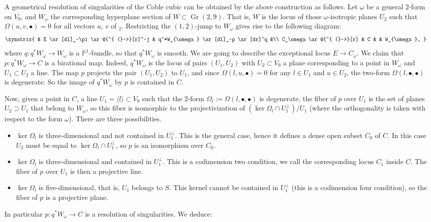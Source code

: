 \documentclass[JEP,XML,SOM,Unicode,NoEqCountersInSection]{cedram}
\newcommand{\sbullet}{{\scriptstyle\bullet}}
\theoremstyle{plain}
\theoremstyle{definition}
\DeclareMathOperator{\Gr}{Gr}
\newcommand{\PP}{\mathbb{P}}
\begin{document}
A geometrical resolution of singularities of the Coble cubic can be obtained by the above construction
as follows. Let $\omega$ be a general 2-form on $V_9$, and $W_\omega$ the corresponding hyperplane section of
$W \subset \Gr(2,9)$. That is, $W$ is the locus of those $\omega$-isotropic planes $U_2$ such that
$\Omega(u,v,\sbullet)=0$ for all vectors $u$, $v$ of $_2$. Restricting the $(1,2)$-jump
to $W_\omega$ gives rise to the following diagram:
\begin{equation*}\label{eq:the-reso-of-coble}
\xymatrix{
& E \ar[dl]_-\pi \ar@{^{ (}->}[r]^-j & q^*W_{\omega} \ar[dl]_-p \ar[dr]^q &\\
C_\omega \ar@{^{ (}->}[r] & C & & W_{\omega},
}
\end{equation*}
where $q: q^*W_{\omega} \to W_{\omega}$ is a $\PP^1$-bundle, so that $q^*W_{\omega}$ is smooth. We are going
to describe the exceptional locus $E \to C_\omega$.
We claim that $p: q^* W_{\omega} \to C$ is a birational map. Indeed, $q^*W_{\omega}$ is the locus
of pairs $(U_1,U_2)$ with $U_2 \subset V_9$ a plane corresponding to a point in $W_{\omega}$ and
$U_1 \subset U_2$ a line. The map $p$ projects the
pair $(U_1,U_2)$ to $U_1$, and since $\Omega(l,u,\sbullet)=0$ for any $l\in U_1$ and $u\in U_2$, the two-form
$\Omega(l,\sbullet,\sbullet)$ is degenerate. So the image of $q^*W_{\omega}$ by $p$ is contained in $C$.

Now, given a point in $C$, \ie a line $U_1=\langle l\rangle\subset V_9$ such that the 2-form $\Omega_l:=\Omega(l,\sbullet,\sbullet)$
is degenerate, the fiber of $p$ over $U_1$ is the set of planes $U_2\supset U_1$ that belong to
$W_{\omega}$, so this fiber is isomorphic to the projectivization of $(\ker \Omega_l \cap U_1^\perp)/U_1$
(where the orthogonality is taken with respect to the form $\omega$).
There are three possibilities.
\begin{itemize}
\item $\ker \Omega_l$ is three-dimensional and not contained in $U_1^\perp$. This is the general case, hence it defines a dense open subset $C_0$ of $C$. In this case $U_2$ must be equal to
$\ker \Omega_l \cap U_1^\perp$, so $p$ is an isomorphism over $C_0$.
\item $\ker \Omega_l$ is three-dimensional and contained in $U_1^\perp$. This is a codimension two condition, we call the corresponding locus $C_1$
inside $C$. The fiber of $p$ over $U_1$ is then
a projective line.
\item $\ker \Omega_l$ is five-dimensional, that is, $U_1$ belongs to $S$. This kernel cannot
be contained in $U_1^\perp$ (this is a codimension four condition), so the fiber of $p$ is
a projective plane.
\end{itemize}
In particular $p : q^*W_\omega\to C$ is a resolution of singularities. We deduce:
\end{document}
